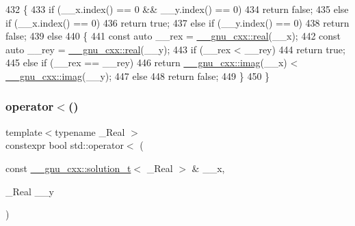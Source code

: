 \begin{DoxyCode}
432     \{
433       \textcolor{keywordflow}{if} (\_\_x.index() == 0 && \_\_y.index() == 0)
434         \textcolor{keywordflow}{return} \textcolor{keyword}{false};
435       \textcolor{keywordflow}{else} \textcolor{keywordflow}{if} (\_\_x.index() == 0)
436         \textcolor{keywordflow}{return} \textcolor{keyword}{true};
437       \textcolor{keywordflow}{else} \textcolor{keywordflow}{if} (\_\_y.index() == 0)
438         \textcolor{keywordflow}{return} \textcolor{keyword}{false};
439       \textcolor{keywordflow}{else}
440         \{
441           \textcolor{keyword}{const} \textcolor{keyword}{auto} \_\_rex = \hyperlink{namespace____gnu__cxx_a2743043701f8e4c87d3f0f06ddb11348}{\_\_gnu\_cxx::real}(\_\_x);
442           \textcolor{keyword}{const} \textcolor{keyword}{auto} \_\_rey = \hyperlink{namespace____gnu__cxx_a2743043701f8e4c87d3f0f06ddb11348}{\_\_gnu\_cxx::real}(\_\_y);
443           \textcolor{keywordflow}{if} (\_\_rex < \_\_rey)
444             \textcolor{keywordflow}{return} \textcolor{keyword}{true};
445           \textcolor{keywordflow}{else} \textcolor{keywordflow}{if} (\_\_rex == \_\_rey)
446             \textcolor{keywordflow}{return} \hyperlink{namespace____gnu__cxx_a685dd0477f8454431bcfb404fa201c57}{\_\_gnu\_cxx::imag}(\_\_x) < \hyperlink{namespace____gnu__cxx_a685dd0477f8454431bcfb404fa201c57}{\_\_gnu\_cxx::imag}(\_\_y);
447           \textcolor{keywordflow}{else}
448             \textcolor{keywordflow}{return} \textcolor{keyword}{false};
449         \}
450     \}
\end{DoxyCode}
\mbox{\label{namespacestd_a749f896a40896157206f192de6dea285}} 
\subsubsection{\texorpdfstring{operator$<$()}{operator<()}\hspace{0.1cm}{\footnotesize\ttfamily [2/5]}}
{\footnotesize\ttfamily template$<$typename \+\_\+\+Real $>$ \\
constexpr bool std\+::operator$<$ (\begin{DoxyParamCaption}\item[{const \hyperlink{namespace____gnu__cxx_ae20ea642de50eb361074c62676b0159c}{\+\_\+\+\_\+gnu\+\_\+cxx\+::solution\+\_\+t}$<$ \+\_\+\+Real $>$ \&}]{\+\_\+\+\_\+x,  }\item[{\+\_\+\+Real}]{\+\_\+\+\_\+y }\end{DoxyParamCaption})}



